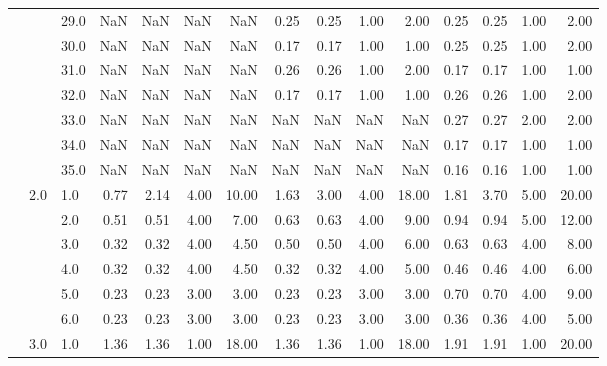 \begin{tabular}{lllrrrrrrrrrrrr}
    &     & 29.0 &        NaN &       NaN &  NaN &    NaN &       0.25 &      0.25 & 1.00 &   2.00 &       0.25 &      0.25 & 1.00 &   2.00 \\
    &     & 30.0 &        NaN &       NaN &  NaN &    NaN &       0.17 &      0.17 & 1.00 &   1.00 &       0.25 &      0.25 & 1.00 &   2.00 \\
    &     & 31.0 &        NaN &       NaN &  NaN &    NaN &       0.26 &      0.26 & 1.00 &   2.00 &       0.17 &      0.17 & 1.00 &   1.00 \\
    &     & 32.0 &        NaN &       NaN &  NaN &    NaN &       0.17 &      0.17 & 1.00 &   1.00 &       0.26 &      0.26 & 1.00 &   2.00 \\
    &     & 33.0 &        NaN &       NaN &  NaN &    NaN &        NaN &       NaN &  NaN &    NaN &       0.27 &      0.27 & 2.00 &   2.00 \\
    &     & 34.0 &        NaN &       NaN &  NaN &    NaN &        NaN &       NaN &  NaN &    NaN &       0.17 &      0.17 & 1.00 &   1.00 \\
    &     & 35.0 &        NaN &       NaN &  NaN &    NaN &        NaN &       NaN &  NaN &    NaN &       0.16 &      0.16 & 1.00 &   1.00 \\
    & 2.0 & 1.0  &       0.77 &      2.14 & 4.00 &  10.00 &       1.63 &      3.00 & 4.00 &  18.00 &       1.81 &      3.70 & 5.00 &  20.00 \\
    &     & 2.0  &       0.51 &      0.51 & 4.00 &   7.00 &       0.63 &      0.63 & 4.00 &   9.00 &       0.94 &      0.94 & 5.00 &  12.00 \\
    &     & 3.0  &       0.32 &      0.32 & 4.00 &   4.50 &       0.50 &      0.50 & 4.00 &   6.00 &       0.63 &      0.63 & 4.00 &   8.00 \\
    &     & 4.0  &       0.32 &      0.32 & 4.00 &   4.50 &       0.32 &      0.32 & 4.00 &   5.00 &       0.46 &      0.46 & 4.00 &   6.00 \\
    &     & 5.0  &       0.23 &      0.23 & 3.00 &   3.00 &       0.23 &      0.23 & 3.00 &   3.00 &       0.70 &      0.70 & 4.00 &   9.00 \\
    &     & 6.0  &       0.23 &      0.23 & 3.00 &   3.00 &       0.23 &      0.23 & 3.00 &   3.00 &       0.36 &      0.36 & 4.00 &   5.00 \\
    & 3.0 & 1.0  &       1.36 &      1.36 & 1.00 &  18.00 &       1.36 &      1.36 & 1.00 &  18.00 &       1.91 &      1.91 & 1.00 &  20.00 \\
\bottomrule
\end{tabular}
